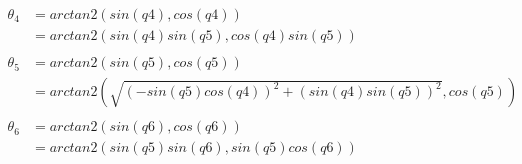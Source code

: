 \begin{align*}
\theta_4 &= arctan2(sin(q4), cos(q4)) \\
         &= arctan2(sin(q4)sin(q5), cos(q4)sin(q5)) \\ 
         & \\
\theta_5 &= arctan2(sin(q5), cos(q5)) \\
         &= arctan2(\sqrt{(-sin(q5)cos(q4))^2 + (sin(q4)sin(q5))^2},cos(q5)) \\
         & \\
\theta_6 &= arctan2(sin(q6), cos(q6)) \\
         &= arctan2(sin(q5)sin(q6), sin(q5)cos(q6)) \\ 
\end{align*}